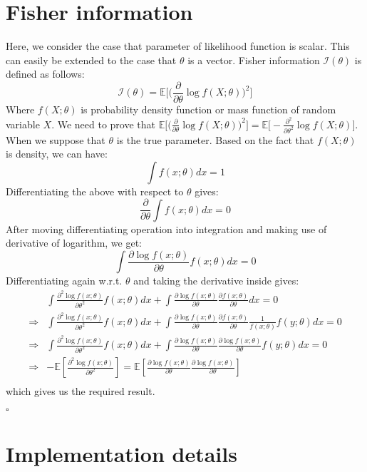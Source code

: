 \section{Fisher information} \label{appendix:fisher_matrix}
Here, we consider the case that parameter of likelihood function is scalar. This can easily be extended to the case that $\theta$ is a vector. Fisher information $\mathcal{I}(\theta)$ is defined as follows:
\begin{equation}
	\mathcal{I}(\theta) = \mathbb{E}\big[\big(\frac{\partial}{\partial \theta}\log{f(X; \theta)}\big)^2\big]
\end{equation}
Where $f(X;\theta)$ is probability density function or mass function of random variable $X$. We need to prove that $\mathbb{E}\big[\big(\frac{\partial}{\partial \theta}\log{f(X; \theta)}\big)^2\big] = \mathbb{E}\big[-\frac{\partial^2}{\partial \theta^2}\log{f(X; \theta)}\big]$.
When we suppose that $\theta$ is the true parameter. Based on the fact that $f(X;\theta)$ is density, we can have:
\[
\int f(x;\theta) dx = 1
\]
Differentiating the above with respect to $\theta$ gives:
\[
\frac{\partial}{\partial \theta}\int f(x;\theta) dx = 0
\]
After moving differentiating operation into integration and making use of derivative of logarithm, we get:
\[
\int \frac{\partial \log f(x;\theta)}{\partial \theta} f(x;\theta) dx = 0
\]
Differentiating again w.r.t. $\theta$ and taking the derivative inside gives:
\[
\begin{aligned}
&\int \frac{\partial^2\log f(x;\theta)}{\partial \theta^2}f(x;\theta) dx + \int \frac{\partial\log f(x;\theta)}{\partial \theta} \frac{\partial f(x;\theta)}{\partial \theta}dx
= 0\\
\Rightarrow &\int \frac{\partial^2\log f(x;\theta)}{\partial \theta^2}f(x;\theta) dx + \int \frac{\partial\log f(x;\theta)}{\partial \theta} \frac{\partial f(x;\theta)}{\partial \theta}\frac{1}{f(x;\theta)} f(y;\theta) dx= 0 \\
\Rightarrow &\int \frac{\partial^2\log f(x;\theta)}{\partial \theta^2}f(x;\theta) dx + \int \frac{\partial\log f(x;\theta)}{\partial \theta} \frac{\partial \log f(x;\theta)}{\partial \theta} f(y;\theta) dx= 0 \\
\Rightarrow & -\mathbb{E}[\frac{\partial^2\log f(x;\theta)}{\partial \theta^2}] = \mathbb{E}[\frac{\partial\log f(x;\theta)}{\partial \theta} \frac{\partial \log f(x;\theta)}{\partial \theta} ] \\
\end{aligned}
\]
which gives us the required result.
 \begin{flushright}
 	$\square$
 \end{flushright}
 
\section{Implementation details}


